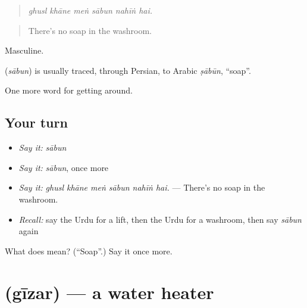 \begin{quote}
     
\end{quote}

\begin{quote}
\emph{ghusl khāne meṅ sābun nahīṅ hai.}
\end{quote}

\begin{quote}
There's no soap in the washroom.
\end{quote}

Masculine.

\begin{cousinweb}
\textbf{} (\emph{sābun}) is usually traced, through Persian, to Arabic \emph{ṣābūn}, \textquotedblleft{}soap\textquotedblright{}.
\end{cousinweb}

\begin{grammarlens}[title={What you've built}]
One more word for getting around.
\end{grammarlens}

\subsection*{Your turn}
\begin{itemize}
\raggedright
  \item \emph{Say it:} \emph{sābun}
  \item \emph{Say it:} \emph{sābun}, once more
  \item \emph{Say it:} \emph{ghusl khāne meṅ sābun nahīṅ hai.} — There's no soap in the washroom.
  \item \emph{Recall:} say the Urdu for a lift, then the Urdu for a washroom, then say \emph{sābun} again
\end{itemize}

\begin{tcolorbox}[breakable,colback=teal!4,colframe=teal!35!black,title={Before you move on}]
What does  mean? (\textquotedblleft{}Soap\textquotedblright{}.) Say it once more.
\end{tcolorbox}
\section[\texorpdfstring{\ur{گیزر} (gīzar)}{گیزر (gīzar)}]{ (gīzar) — a water heater}

\label{lesson:UR-C404-gizar}



